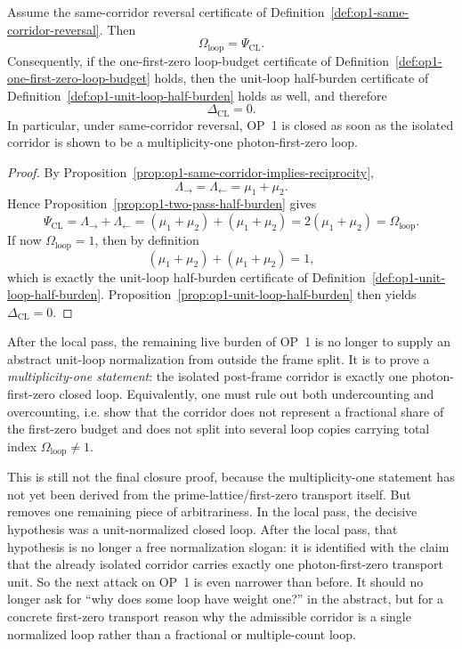 \begin{proposition}
\label{prop:op1-one-first-zero-loop-budget}
Assume the same-corridor reversal certificate of Definition~\ref{def:op1-same-corridor-reversal}. Then
\[
 \Omega_{\mathrm{loop}} = \Psi_{\mathrm{CL}}.
\]
Consequently, if the one-first-zero loop-budget certificate of Definition~\ref{def:op1-one-first-zero-loop-budget} holds, then the unit-loop half-burden certificate of Definition~\ref{def:op1-unit-loop-half-burden} holds as well, and therefore
\[
 \Delta_{\mathrm{CL}} = 0.
\]
In particular, under same-corridor reversal, OP~1 is closed as soon as the isolated corridor is shown to be a multiplicity-one photon-first-zero loop.
\end{proposition}

\begin{proof}
By Proposition~\ref{prop:op1-same-corridor-implies-reciprocity},
\[
 \Lambda_{\rightarrow}=\Lambda_{\leftarrow}=\mu_1+\mu_2.
\]
Hence Proposition~\ref{prop:op1-two-pass-half-burden} gives
\[
 \Psi_{\mathrm{CL}} = \Lambda_{\rightarrow}+\Lambda_{\leftarrow}
 = (\mu_1+\mu_2)+(\mu_1+\mu_2)
 = 2(\mu_1+\mu_2)
 = \Omega_{\mathrm{loop}}.
\]
If now \(\Omega_{\mathrm{loop}}=1\), then by definition
\[
 (\mu_1+\mu_2)+(\mu_1+\mu_2)=1,
\]
which is exactly the unit-loop half-burden certificate of Definition~\ref{def:op1-unit-loop-half-burden}. Proposition~\ref{prop:op1-unit-loop-half-burden} then yields \(\Delta_{\mathrm{CL}}=0\).
\end{proof}

\begin{corollary}
\label{cor:op1-live-burden-after-r09}
After the local pass, the remaining live burden of OP~1 is no longer to supply an abstract unit-loop normalization from outside the frame split. It is to prove a \emph{multiplicity-one statement}: the isolated post-frame corridor is exactly one photon-first-zero closed loop. Equivalently, one must rule out both undercounting and overcounting, i.e. show that the corridor does not represent a fractional share of the first-zero budget and does not split into several loop copies carrying total index \(\Omega_{\mathrm{loop}}\neq 1\).
\end{corollary}

\begin{remark}
This is still not the final closure proof, because the multiplicity-one statement has not yet been derived from the prime-lattice/first-zero transport itself. But removes one remaining piece of arbitrariness. In the local pass, the decisive hypothesis was a unit-normalized closed loop. After the local pass, that hypothesis is no longer a free normalization slogan: it is identified with the claim that the already isolated corridor carries exactly one photon-first-zero transport unit. So the next attack on OP~1 is even narrower than before. It should no longer ask for ``why does some loop have weight one?'' in the abstract, but for a concrete first-zero transport reason why the admissible corridor is a single normalized loop rather than a fractional or multiple-count loop.
\end{remark}



